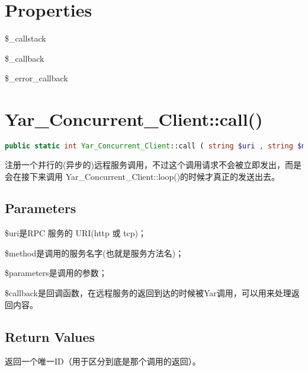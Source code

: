 \section{Properties}

\begin{compactitem}
\item \$\_callstack
\item \$\_callback
\item \$\_error\_callback
\end{compactitem}




\section{Yar\_Concurrent\_Client::call()}

\begin{lstlisting}[language=PHP]
public static int Yar_Concurrent_Client::call ( string $uri , string $method , array $parameters [, callable $callback ] )
\end{lstlisting}


注册一个并行的(异步的)远程服务调用，不过这个调用请求不会被立即发出，而是会在接下来调用 Yar\_Concurrent\_Client::loop()的时候才真正的发送出去。




\subsection{Parameters}


\begin{compactitem}
\item \$uri是RPC 服务的 URI(http 或 tcp)；
\item \$method是调用的服务名字(也就是服务方法名)；
\item \$parameters是调用的参数；
\item \$callback是回调函数，在远程服务的返回到达的时候被Yar调用，可以用来处理返回内容。
\end{compactitem}




\subsection{Return Values}

返回一个唯一ID（用于区分到底是那个调用的返回）。




